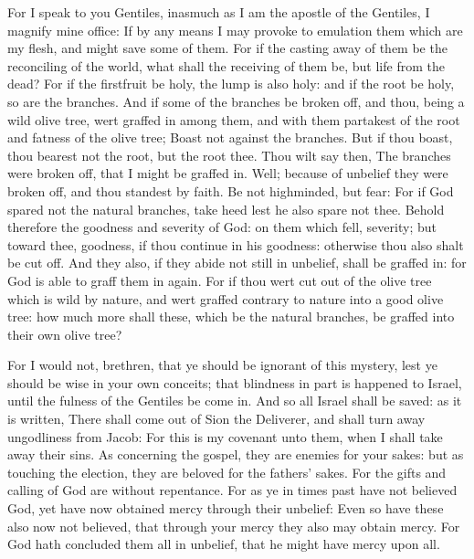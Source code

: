  For I speak to you Gentiles, inasmuch as I am the
apostle of the Gentiles, I magnify mine office:  If by
any means I may provoke to emulation them which are my flesh, and might
save some of them.  For if the casting away of them be
the reconciling of the world, what shall the receiving of them be, but
life from the dead?  For if the firstfruit be holy, the
lump is also holy: and if the root be holy, so are the branches.
 And if some of the branches be broken off, and thou,
being a wild olive tree, wert graffed in among them, and with them
partakest of the root and fatness of the olive tree; 
Boast not against the branches. But if thou boast, thou bearest not the
root, but the root thee.  Thou wilt say then, The
branches were broken off, that I might be graffed in. 
Well; because of unbelief they were broken off, and thou standest by
faith. Be not highminded, but fear:  For if God spared
not the natural branches, take heed lest he also spare not thee.
 Behold therefore the goodness and severity of God: on
them which fell, severity; but toward thee, goodness, if thou continue
in his goodness: otherwise thou also shalt be cut off. 
And they also, if they abide not still in unbelief, shall be graffed in:
for God is able to graff them in again.  For if thou wert
cut out of the olive tree which is wild by nature, and wert graffed
contrary to nature into a good olive tree: how much more shall these,
which be the natural branches, be graffed into their own olive tree?

 For I would not, brethren, that ye should be ignorant of
this mystery, lest ye should be wise in your own conceits; that
blindness in part is happened to Israel, until the fulness of the
Gentiles be come in.  And so all Israel shall be saved:
as it is written, There shall come out of Sion the Deliverer, and shall
turn away ungodliness from Jacob:  For this is my
covenant unto them, when I shall take away their sins. 
As concerning the gospel, they are enemies for your sakes: but as
touching the election, they are beloved for the fathers' sakes.
 For the gifts and calling of God are without repentance.
 For as ye in times past have not believed God, yet have
now obtained mercy through their unbelief:  Even so have
these also now not believed, that through your mercy they also may
obtain mercy.  For God hath concluded them all in
unbelief, that he might have mercy upon all.


